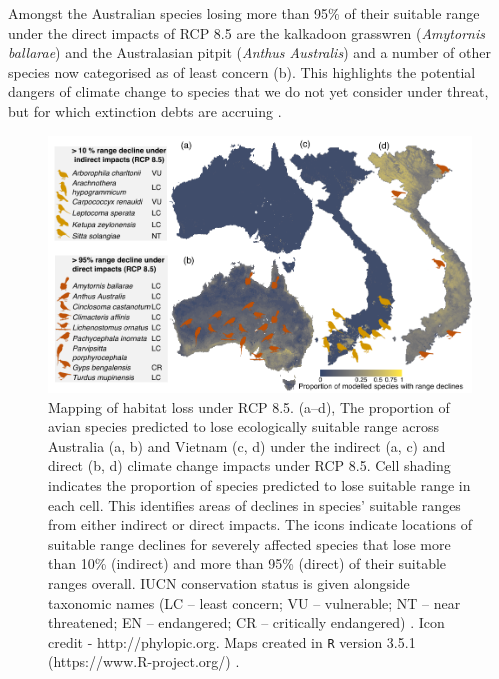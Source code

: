 Amongst the Australian species losing more than 95\% of their suitable range under the direct impacts of RCP 8.5 are the kalkadoon grasswren (\textit{Amytornis ballarae}) and the Australasian pitpit (\textit{Anthus Australis}) and a number of other species now categorised as of least concern (b). This highlights the potential dangers of climate change to species that we do not yet consider under threat, but for which extinction debts are accruing \citep{kuussaari_extinction_2009}.

\begin{figure}[htb]
  \centering
  \includegraphics[width=\textwidth]{chapters/figures/chapter2/fig4.pdf}
  \caption{Mapping of habitat loss under RCP 8.5. (a–d),  The proportion of avian species predicted to lose ecologically suitable range across Australia (a, b) and Vietnam (c, d) under the indirect (a, c) and direct (b, d) climate change impacts under RCP 8.5. Cell shading indicates the proportion of species predicted to lose suitable range in each cell.  This identifies areas of declines in species’ suitable ranges from either indirect or direct impacts. The icons indicate locations of suitable range declines for severely affected species that lose more than 10\% (indirect) and more than 95\% (direct) of their suitable ranges overall. IUCN conservation status is given alongside taxonomic names (LC – least concern; VU – vulnerable; NT – near threatened; EN – endangered; CR – critically endangered) \citep{iucn_iucn_2018}. Icon credit - http://phylopic.org.  Maps created in \texttt{R} version 3.5.1 (https://www.R-project.org/) \citep{r_development_core_team_r_2008}.}
  \label{ch2:fig4}
\end{figure}

